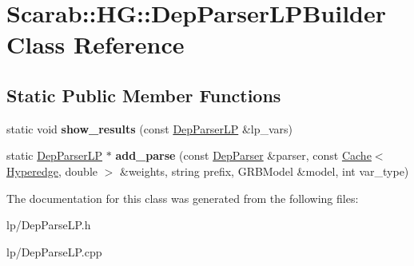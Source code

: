 \hypertarget{classScarab_1_1HG_1_1DepParserLPBuilder}{
\section{Scarab::HG::DepParserLPBuilder Class Reference}
\label{classScarab_1_1HG_1_1DepParserLPBuilder}
}
\subsection*{Static Public Member Functions}
\begin{DoxyCompactItemize}
\item 
\hypertarget{classScarab_1_1HG_1_1DepParserLPBuilder_a8864b215a93fa51c4df30669dacb0ddc}{
static void {\bfseries show\_\-results} (const \hyperlink{structScarab_1_1HG_1_1DepParserLP}{DepParserLP} \&lp\_\-vars)}
\label{classScarab_1_1HG_1_1DepParserLPBuilder_a8864b215a93fa51c4df30669dacb0ddc}

\item 
\hypertarget{classScarab_1_1HG_1_1DepParserLPBuilder_a862127f9347f244103941a119747b810}{
static \hyperlink{structScarab_1_1HG_1_1DepParserLP}{DepParserLP} $\ast$ {\bfseries add\_\-parse} (const \hyperlink{classDepParser}{DepParser} \&parser, const \hyperlink{classCache}{Cache}$<$ \hyperlink{classScarab_1_1HG_1_1Hyperedge}{Hyperedge}, double $>$ \&weights, string prefix, GRBModel \&model, int var\_\-type)}
\label{classScarab_1_1HG_1_1DepParserLPBuilder_a862127f9347f244103941a119747b810}

\end{DoxyCompactItemize}


The documentation for this class was generated from the following files:\begin{DoxyCompactItemize}
\item 
lp/DepParseLP.h\item 
lp/DepParseLP.cpp\end{DoxyCompactItemize}
